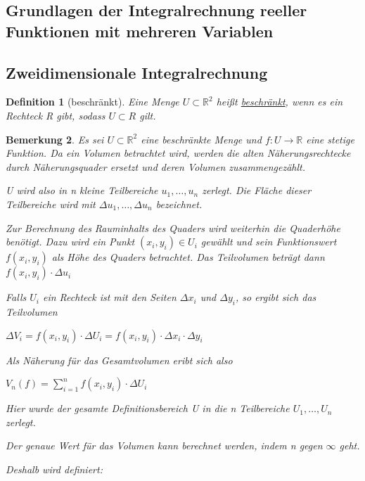 \documentclass[fontset=ubuntu,11pt,a4paper,fleqn,headsepline]{scrreprt}
\newtheorem{defi}{Definition}[section]
\newtheorem{bemerkung}[defi]{Bemerkung}
\begin{document}
\begin{multicols}{2}
    \chapter*{Grundlagen der Integralrechnung reeller Funktionen mit mehreren Variablen}
    
        \section*{Zweidimensionale Integralrechnung}
    
        \begin{defi}[beschränkt]
            Eine Menge \(U\subset\mathbb{R}^2\) heißt \underline{beschränkt}, wenn es ein Rechteck R gibt, sodass \(U\subset R\) gilt.
        \end{defi}
        
        \begin{bemerkung}
            Es sei \(U\subset \mathbb{R}^2\) eine beschränkte Menge und \(f:U\to \mathbb{R}\) eine stetige Funktion. Da ein Volumen betrachtet wird, werden die alten Näherungsrechtecke durch Näherungsquader ersetzt und deren Volumen zusammengezählt.
    
            U wird also in n kleine Teilbereiche \(u_1,\dots,u_n\) zerlegt. Die Fläche dieser Teilbereiche wird mit \(\Delta u_1,\dots,\Delta u_n\) bezeichnet.
    
            Zur Berechnung des Rauminhalts des Quaders wird weiterhin die Quaderhöhe benötigt. Dazu wird ein Punkt \((x_i,y_i)\in U_i\) gewählt und sein Funktionswert \(f(x_i,y_i)\) als Höhe des Quaders betrachtet. Das Teilvolumen beträgt dann \(f(x_i,y_i)\cdot\Delta u_i\)
    
            Falls \(U_i\) ein Rechteck ist mit den Seiten \(\Delta x_i\) und \(\Delta y_i\), so ergibt sich das Teilvolumen
            
            \(\Delta V_i = f(x_i,y_i)\cdot \Delta U_i=f(x_i,y_i)\cdot \Delta x_i\cdot \Delta y_i\)
    
            Als Näherung für das Gesamtvolumen eribt sich also
    
            \(V_n(f)=\sum^{n}_{i=1} f(x_i,y_i)\cdot\Delta U_i\)
    
            Hier wurde der gesamte Definitionsbereich U in die n Teilbereiche \(U_1,\dots,U_n\) zerlegt.
    
            Der genaue Wert für das Volumen kann berechnet werden, indem n gegen \(\infty\) geht.
    
            Deshalb wird definiert:
    

\end{bemerkung}
\end{multicols}
\end{document}
